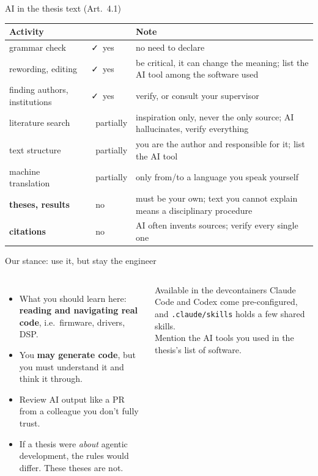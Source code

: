 \documentclass[aspectratio=169,10pt]{beamer}
\newcommand{\code}[1]{\texttt{#1}}
\begin{document}
\begin{frame}{AI in the thesis text (Art.\ 4.1)}
  \small
  \renewcommand{\arraystretch}{1.25}
  \newcommand{\aiyes}{\textcolor{okgreen}{\faCheck\ yes}}
  \newcommand{\aipart}{\textcolor{tD}{\faAdjust\ partially}}
  \newcommand{\aino}{\textcolor{accent}{\faTimes\ no}}
  \begin{tabular}{@{}l l >{\raggedright\arraybackslash\scriptsize}p{}@{}}
    \toprule
    \textbf{Activity} & & \textbf{Note} \\
    \midrule
    grammar check          & \aiyes  & no need to declare \\
    rewording, editing     & \aiyes  & be critical, it can change the meaning; list the AI tool among the software used \\
    finding authors, institutions & \aiyes & verify, or consult your supervisor \\
    literature search      & \aipart & inspiration only, never the only source; AI hallucinates, verify everything \\
    text structure         & \aipart & you are the author and responsible for it; list the AI tool \\
    machine translation    & \aipart & only from/to a language you speak yourself \\
    \textbf{theses, results} & \aino & must be your own; text you cannot explain means a disciplinary procedure \\
    \textbf{citations}     & \aino   & AI often invents sources; verify every single one \\
    \bottomrule
  \end{tabular}
\end{frame}

\begin{frame}{Our stance: use it, but stay the engineer}
  \begin{columns}[c,onlytextwidth]
      \begin{itemize}
        \setlength{\itemsep}{6pt}
        \item What you should learn here: \textbf{reading and navigating real code}, i.e.\ firmware,
          drivers, DSP.
        \item You \textbf{may generate code}, but you must understand it and think it through.
        \item Review AI output like a PR from a colleague you don't fully trust.
        \item If a thesis were \emph{about} agentic development, the rules would differ.
          These theses are not.
      \end{itemize}
      \begin{block}{Available in the devcontainers}
        \small
        Claude Code and Codex come pre-configured, and \code{.claude/skills} holds a few shared skills.\\[4pt]
        Mention the AI tools you used in the thesis's list of software.
      \end{block}
  \end{columns}
\end{frame}
\end{document}
